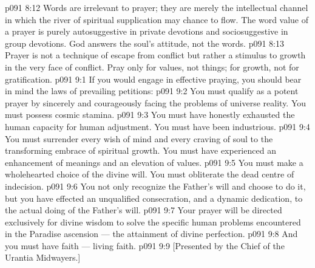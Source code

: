 \vs p091 8:12 Words are irrelevant to prayer; they are merely the intellectual channel in which the river of spiritual supplication may chance to flow. The word value of a prayer is purely autosuggestive in private devotions and sociosuggestive in group devotions. God answers the soul’s attitude, not the words.
\vs p091 8:13 Prayer is not a technique of escape from conflict but rather a stimulus to growth in the very face of conflict. Pray only for values, not things; for growth, not for gratification.
\vs p091 9:1 If you would engage in effective praying, you should bear in mind the laws of prevailing petitions:
\vs p091 9:2 \bibnobreakspace You must qualify as a potent prayer by sincerely and courageously facing the problems of universe reality. You must possess cosmic stamina.
\vs p091 9:3 \bibnobreakspace You must have honestly exhausted the human capacity for human adjustment. You must have been industrious.
\vs p091 9:4 \bibnobreakspace You must surrender every wish of mind and every craving of soul to the transforming embrace of spiritual growth. You must have experienced an enhancement of meanings and an elevation of values.
\vs p091 9:5 \bibnobreakspace You must make a wholehearted choice of the divine will. You must obliterate the dead centre of indecision.
\vs p091 9:6 \bibnobreakspace You not only recognize the Father’s will and choose to do it, but you have effected an unqualified consecration, and a dynamic dedication, to the actual doing of the Father’s will.
\vs p091 9:7 \bibnobreakspace Your prayer will be directed exclusively for divine wisdom to solve the specific human problems encountered in the Paradise ascension --- the attainment of divine perfection.
\vs p091 9:8 \bibnobreakspace And you must have faith --- living faith.
\vsetoff
\vs p091 9:9 [Presented by the Chief of the Urantia Midwayers.]
